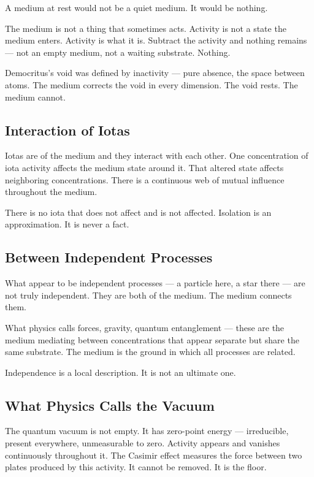 \documentclass[11pt]{article}
\begin{document}
A medium at rest would not be a quiet medium. It would be nothing.

The medium is not a thing that sometimes acts. Activity is not a state the medium
enters. Activity is what it is. Subtract the activity and nothing remains — not
an empty medium, not a waiting substrate. Nothing.

Democritus's void was defined by inactivity — pure absence, the space between
atoms. The medium corrects the void in every dimension. The void rests. The
medium cannot.

\subsection{Interaction of Iotas}
\label{sec:org1e16698}

Iotas are of the medium and they interact with each other. One concentration of
iota activity affects the medium state around it. That altered state affects
neighboring concentrations. There is a continuous web of mutual influence
throughout the medium.

There is no iota that does not affect and is not affected. Isolation is an
approximation. It is never a fact.

\subsection{Between Independent Processes}
\label{sec:orgd1d6d0a}

What appear to be independent processes — a particle here, a star there — are not
truly independent. They are both of the medium. The medium connects them.

What physics calls forces, gravity, quantum entanglement — these are the medium
mediating between concentrations that appear separate but share the same
substrate. The medium is the ground in which all processes are related.

Independence is a local description. It is not an ultimate one.

\subsection{What Physics Calls the Vacuum}
\label{sec:org1cf797d}

The quantum vacuum is not empty. It has zero-point energy — irreducible, present
everywhere, unmeasurable to zero. Activity appears and vanishes continuously
throughout it. The Casimir effect measures the force between two plates produced
by this activity. It cannot be removed. It is the floor.
\end{document}

